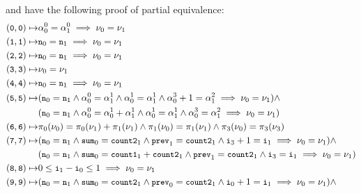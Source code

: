 %
 and  have the following proof of
partial equivalence:
%
\begin{align*}
  (\cc{0}, \cc{0}) \mapsto & %
  \alpha_0^0 = \alpha_1^0 \implies \nu_0 = \nu_1 \\
  (\cc{1}, \cc{1}) \mapsto & %
  \cc{n}_0 = \cc{n}_1 \implies \nu_0 = \nu_1 \\
  (\cc{2}, \cc{2}) \mapsto & %
  \cc{n}_0 = \cc{n}_1 \implies \nu_0 = \nu_1 \\
  (\cc{3}, \cc{3}) \mapsto & \nu_0 = \nu_1 \\
  (\cc{4}, \cc{4}) \mapsto & %
  \cc{n}_0 = \cc{n}_1 \implies \nu_0 = \nu_1 \\
  (\cc{5}, \cc{5}) \mapsto & %
  (\cc{n}_0 = \cc{n}_1 \land %
  \alpha_0^0 = \alpha_1^1 \land %
  \alpha_0^1 = \alpha_1^1 \land %
  \alpha_0^3 + 1 = \alpha_1^2 \implies %
  \nu_0 = \nu_1) \land \\
  & (\cc{n}_0 = \cc{n}_1 \land %
  \alpha_0^0 = \alpha_0^1 + \alpha_1^1 \land %
  \alpha_0^1 = \alpha_1^1 \land %
  \alpha_0^3 = \alpha_1^2 \implies %
  \nu_0 = \nu_1) \\
  (\cc{6}, \cc{6}) \mapsto & %
  \pi_0(\nu_0) = \pi_0(\nu_1) + \pi_1(\nu_1) \land %
  \pi_1(\nu_0) = \pi_1(\nu_1) \land %
  \pi_3(\nu_0) = \pi_3(\nu_3) \\
  (\cc{7}, \cc{7}) \mapsto & 
  (\cc{n}_0 = \cc{n}_1 \land %
  \cc{sum}_0 = \cc{count2}_1 \land %
  \cc{prev}_1 = \cc{count2}_1 \land %
  \cc{i}_3 + 1 = \cc{i}_1 \implies %
  \nu_0 = \nu_1) \land \\
  & (\cc{n}_0 = \cc{n}_1 \land %
  \cc{sum}_0 = \cc{count1}_1 + \cc{count2}_1 \land %
  \cc{prev}_1 = \cc{count2}_1 \land %
  \cc{i}_3 = \cc{i}_1 \implies %
  \nu_0 = \nu_1) \\
  (\cc{8}, \cc{8}) \mapsto & 0 \leq \cc{i}_1 - \cc{i}_0 \leq 1 \implies %
  \nu_0 = \nu_1 \\
  (\cc{9}, \cc{9}) \mapsto & 
  (\cc{n}_0 = \cc{n}_1 \land %
  \cc{sum}_0 = \cc{count2}_1 \land %
  \cc{prev}_0 = \cc{count2}_1 \land %
  \cc{i}_0 + 1 = \cc{i}_1 \implies %
  \nu_0 = \nu_1) \land \\

\end{align*}
